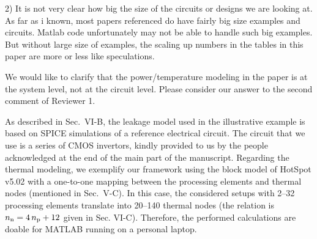\begin{reviewer}
2) It is not very clear how big the size of the circuits or designs we are looking at.
As far as i known, most papers referenced do have fairly big size examples and circuits. Matlab code unfortunately may not be able to handle such big examples.
But without large size of examples, the scaling up numbers in the tables in this paper are more or less like speculations.
\end{reviewer}
\begin{authors}
We would like to clarify that the power/temperature modeling in the paper is at the system level, not at the circuit level.
Please consider our answer to the second comment of Reviewer 1.

As described in Sec.~VI-B, the leakage model used in the illustrative example is based on SPICE simulations of a reference electrical circuit.
The circuit that we use is a series of CMOS invertors, kindly provided to us by the people acknowledged at the end of the main part of the manuscript.
Regarding the thermal modeling, we exemplify our framework using the block model of HotSpot v5.02 with a one-to-one mapping between the processing elements and thermal nodes (mentioned in Sec.~V-C).
In this case, the considered setups with 2--32 processing elements translate into 20--140 thermal nodes (the relation is ${n_\text{n}} = 4 \, {n_\text{p}} + 12$ given in Sec. VI-C).
Therefore, the performed calculations are doable for MATLAB running on a personal laptop.


\end{authors}

